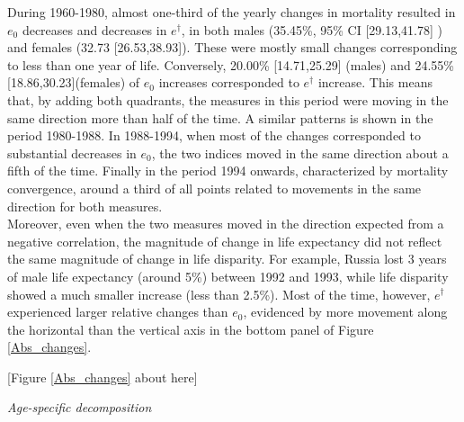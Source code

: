 \documentclass{article}
\begin{document}
\begin{spacing}{1.5}
During 1960-1980, almost one-third of the yearly changes in mortality resulted in $e_0$ decreases and decreases in $e^\dagger$, in both males (35.45\%, 95\% CI [29.13,41.78] ) and females (32.73 [26.53,38.93]). These were mostly small changes corresponding to less than one year of life. Conversely, 20.00\% [14.71,25.29] (males) and 24.55\% [18.86,30.23](females) of $e_0$ increases corresponded to $e^\dagger$ increase. This means that, by adding both quadrants, the measures in this period were moving in the same direction more than half of the time. A similar patterns is shown in the period 1980-1988. In 1988-1994, when most of the changes corresponded to substantial decreases in $e_0$, the two indices moved in the same direction about a fifth of the time. Finally in the period 1994 onwards, characterized by mortality convergence, around a third of all points related to movements in the same direction for both measures. \\

Moreover, even when the two measures moved in the direction expected from a negative correlation, the magnitude of change in life expectancy did not reflect the same magnitude of change in life disparity. For example, Russia lost 3 years of male life expectancy (around 5\%) between 1992 and 1993, while life disparity showed a much smaller increase (less than 2.5\%). Most of the time, however, $e^\dagger$ experienced larger relative changes than $e_0$, evidenced by more movement along the horizontal than the vertical axis in the bottom panel of Figure \ref{Abs_changes}.


\begin{center}
[Figure \ref{Abs_changes} about here]
\end{center}

\emph{Age-specific decomposition}\\




\end{spacing}
\end{document}
